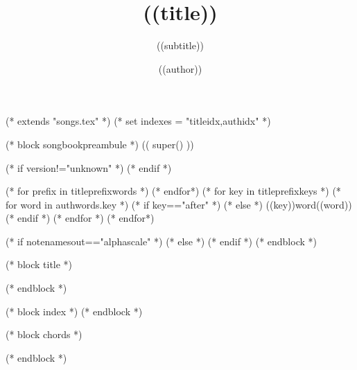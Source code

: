 (* extends "songs.tex" *)
(* set indexes = "titleidx,authidx" *)

(* block songbookpreambule *)
   (( super() ))

  \usepackage{chords}

   \title{((title))}
   \author{((author))}
   \subtitle{((subtitle))}
   (* if version!="unknown" *)
   (* endif *)


   (* for prefix in titleprefixwords *)
   (* endfor*)
   (* for key in titleprefixkeys *)
      (* for word in authwords.key *)
      (* if key=="after" *)
      (* else *)
      \auth((key))word{((word))}
      (* endif *)
      (* endfor *)
   (* endfor*)
   
   (* if notenamesout=="alphascale" *)
    (* else *)
   (* endif *)
(* endblock *)

(* block title *)
\maketitle
(* endblock *)

(* block index *)
(* endblock *)

(* block chords *)
   \ifchorded
   \chords
   \fi
(* endblock *)

